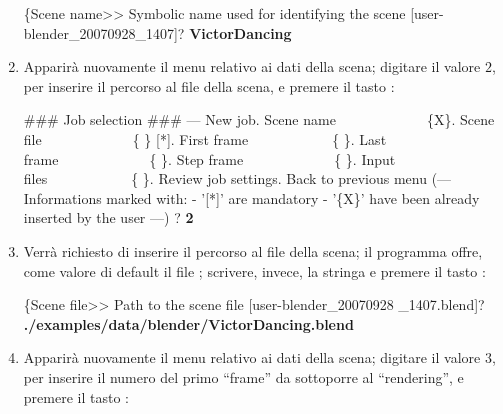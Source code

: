 \begin{enumerate}
\begin{mgCodeBox}
\small
\{Scene name>> Symbolic name used for identifying the scene [user-blender\_20070928\_1407]? \textbf{VictorDancing}
\end{mgCodeBox}
\item Apparir\`a nuovamente il menu relativo ai dati della scena; digitare il valore $2$, per inserire il percorso al file della scena, e premere il tasto :
\begin{mgCodeBox}
\small
\#\#\# Job selection \#\#\#\newline
--- New job. Scene name\ \ \ \ \ \ \ \ \ \ \ \ \ \{X\}. Scene file\ \ \ \ \ \ \ \ \ \ \ \ \ \{ \} [*]. First frame\ \ \ \ \ \ \ \ \ \ \ \ \{ \}. Last frame\ \ \ \ \ \ \ \ \ \ \ \ \ \{ \}. Step frame\ \ \ \ \ \ \ \ \ \ \ \ \ \{ \}. Input files\ \ \ \ \ \ \ \ \ \ \ \ \{ \}. Review job settings. Back to previous menu\newline
(---\newline
 Informations marked with:\newline
 - '[*]' are mandatory\newline
 - '\{X\}' have been already inserted by the user\newline
---)\newline
? \textbf{2}
\end{mgCodeBox}
\item Verr\`a richiesto di inserire il percorso al file della scena; il programma offre, come valore di default il file ; scrivere, invece, la stringa  e premere il tasto :
\begin{mgCodeBox}
\small
\{Scene file>> Path to the scene file [user-blender\_20070928\newline
\_1407.blend]?  \textbf{./examples/data/blender/VictorDancing.blend}
\end{mgCodeBox}
\item \label{lbl:exec-victor-startframe-useless} Apparir\`a nuovamente il menu relativo ai dati della scena; digitare il valore $3$, per inserire il numero del primo ``frame'' da sottoporre al ``rendering'', e premere il tasto :

\end{enumerate}
